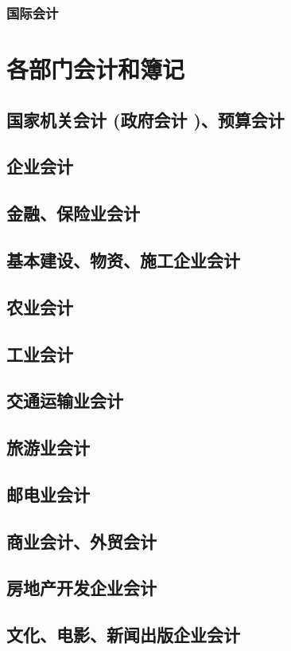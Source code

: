 \documentclass[UTF8]{../../RepresentationUniverse}
\begin{document}
    \subsubsection{国际会计}
\section{各部门会计和簿记}
    \subsection{国家机关会计 (政府会计 )、预算会计}
    \subsection{企业会计}
    \subsection{金融、保险业会计}
    \subsection{基本建设、物资、施工企业会计}
    \subsection{农业会计}
    \subsection{工业会计}
    \subsection{交通运输业会计}
    \subsection{旅游业会计}
    \subsection{邮电业会计}
    \subsection{商业会计、外贸会计}
    \subsection{房地产开发企业会计}
    \subsection{文化、电影、新闻出版企业会计}
\end{document}
